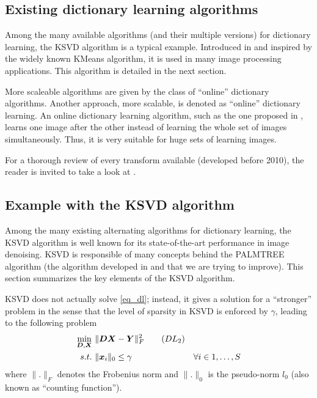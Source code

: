\subsection{Existing dictionary learning algorithms}
Among the many available algorithms (and their multiple versions) for dictionary learning, the \ac{KSVD} algorithm is a typical example. Introduced in \cite{aharon_k-svd:_2006} and inspired by the widely known \gls{KMeans} algorithm, it is used in many image processing applications. This algorithm is detailed in the next section.

\noindent
More scaleable algorithms are given by the class of “online” dictionary algorithms.
Another approach, more scalable, is denoted as “online” dictionary learning. An online dictionary learning algorithm, such as the one proposed in \cite{mairal_online_2010}, learns one image after the other instead of learning the whole set of images simultaneously. Thus, it is very suitable for huge sets of learning images.

\noindent
For a thorough review of every transform available (developed before 2010), the reader is invited to take a look at  \cite{rubinstein_dictionaries_2010}.


\subsection{Example with the \acs{KSVD} algorithm}

Among the many existing alternating algorithms for dictionary learning, the \ac{KSVD} algorithm is well known for its state-of-the-art performance in image denoising. \ac{KSVD} is responsible of many concepts behind the \acs{PALMTREE} algorithm (the algorithm developed in \cite{chabiron_optimization_2016} and that we are trying to improve). This section summarizes the key elements of the \ac{KSVD} algorithm.

\ac{KSVD} does not actually solve \eqref{eq_dl}; instead, it gives a solution for a “stronger” problem in the sense that the level of sparsity in \ac{KSVD} is enforced by $\gamma$, leading to the following problem
\begin{align*}
\underset{\bm{D},\bm{X}}{\min}~ & \lVert \bm{D}\bm{X}-\bm{Y} \rVert^2_F \tag{$DL_2$}\label{eq_dl_ksvd} \\
s.t.~& \lVert \bm{x}_i \rVert_0 \le \gamma & \forall i \in 1,\dots,S
\end{align*}
where $\lVert . \rVert_F$ denotes the Frobenius norm and $\lVert . \rVert_0$ is the pseudo-norm $l_0$ (also known as “counting function”).

